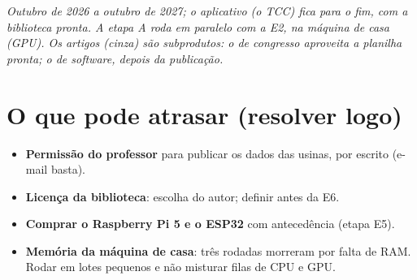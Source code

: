 \documentclass[10pt,a4paper]{article}
\newcommand{\nota}[1]{{\small\itshape\color{cinza}#1\par}}
\begin{document}
\vspace{3pt}
\nota{Outubro de 2026 a outubro de 2027; o aplicativo (o TCC) fica para o fim, com a biblioteca pronta.
A etapa A roda em paralelo com a E2, na máquina de casa (GPU).
Os artigos (cinza) são subprodutos: o de congresso aproveita a planilha pronta; o de software, depois da
publicação.}

\section{O que pode atrasar (resolver logo)}
\begin{itemize}
  \item \textbf{Permissão do professor} para publicar os dados das usinas, por escrito (e-mail basta).
  \item \textbf{Licença da biblioteca}: escolha do autor; definir antes da E6.
  \item \textbf{Comprar o Raspberry Pi 5 e o ESP32} com antecedência (etapa E5).
  \item \textbf{Memória da máquina de casa}: três rodadas morreram por falta de RAM. Rodar em lotes
        pequenos e não misturar filas de CPU e GPU.
\end{itemize}
\end{document}
